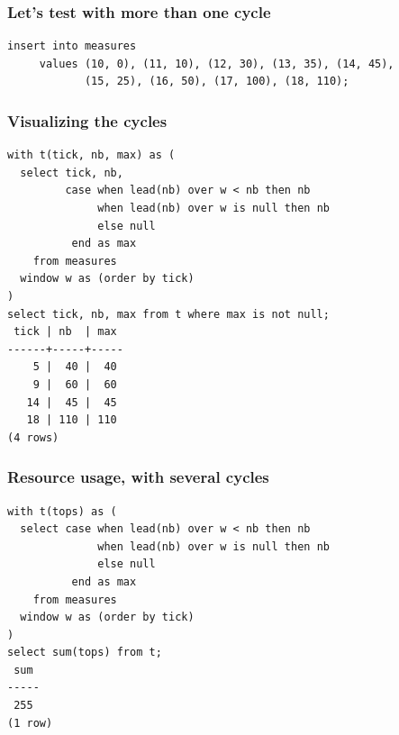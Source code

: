 \documentclass{beamer}
\begin{document}

\begin{frame}[fragile]
  \frametitle{Let's test with more than one cycle}

\begin{verbatim}
insert into measures
     values (10, 0), (11, 10), (12, 30), (13, 35), (14, 45),
            (15, 25), (16, 50), (17, 100), (18, 110);
\end{verbatim}
\end{frame}

\begin{frame}[fragile]
  \frametitle{Visualizing the cycles}

\begin{verbatim}
with t(tick, nb, max) as (
  select tick, nb,
         case when lead(nb) over w < nb then nb
              when lead(nb) over w is null then nb
              else null
          end as max
    from measures
  window w as (order by tick)
)
select tick, nb, max from t where max is not null;
 tick | nb  | max 
------+-----+-----
    5 |  40 |  40
    9 |  60 |  60
   14 |  45 |  45
   18 | 110 | 110
(4 rows)
\end{verbatim}
\end{frame}


\begin{frame}[fragile]
  \frametitle{Resource usage, with several cycles}

\begin{verbatim}
with t(tops) as (
  select case when lead(nb) over w < nb then nb
              when lead(nb) over w is null then nb
              else null
          end as max
    from measures
  window w as (order by tick)
)
select sum(tops) from t;
 sum 
-----
 255
(1 row)
\end{verbatim}
\end{frame}
\end{document}
